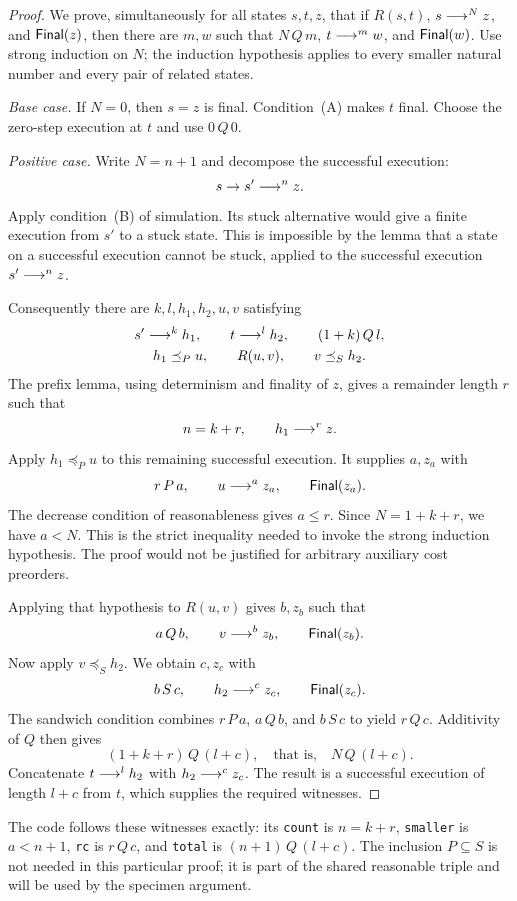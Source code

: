 \begin{proof}
We prove, simultaneously for all states $s,t,z$, that if $R(s,t)$,
$s\mathrel{\longrightarrow^{N}}z$, and $\mathsf{Final}(z)$, then there are $m,w$ such that
$N\,Q\,m$, $t\mathrel{\longrightarrow^{m}}w$, and $\mathsf{Final}(w)$. Use strong induction on $N$;
the induction hypothesis applies to every smaller natural number and every
pair of related states.

\emph{Base case.} If $N=0$, then $s=z$ is final. Condition~(A) makes
$t$ final. Choose the zero-step execution at $t$ and use $0\,Q\,0$.

\emph{Positive case.} Write $N=n+1$ and decompose the successful execution:
\[
 s\to s'\mathrel{\longrightarrow^{n}}z.
\]
Apply condition~(B) of simulation. Its stuck alternative would give a
finite execution from $s'$ to a stuck state. This is impossible by the
lemma that a state on a successful execution cannot be stuck, applied to
the successful execution $s'\mathrel{\longrightarrow^{n}}z$.

Consequently there are $k,l,h_1,h_2,u,v$ satisfying
\begin{gather*}
 s'\mathrel{\longrightarrow^{k}}h_1,\qquad t\mathrel{\longrightarrow^{l}}h_2,\qquad (1+k)\,Q\,l,\\
 h_1\preceq_P u,\qquad R(u,v),\qquad v\preceq_S h_2.
\end{gather*}
The prefix lemma, using determinism and finality of $z$, gives a remainder
length $r$ such that
\[
 n=k+r,\qquad h_1\mathrel{\longrightarrow^{r}}z.
\]
Apply $h_1\preceq_P u$ to this remaining successful execution. It supplies
$a,z_a$ with
\[
 r\,P\,a,\qquad u\mathrel{\longrightarrow^{a}}z_a,\qquad \mathsf{Final}(z_a).
\]
The decrease condition of reasonableness gives $a\leq r$. Since
$N=1+k+r$, we have $a<N$. This is the strict inequality needed to invoke
the strong induction hypothesis. The proof would not be justified for
arbitrary auxiliary cost preorders.

Applying that hypothesis to $R(u,v)$ gives $b,z_b$ such that
\[
 a\,Q\,b,\qquad v\mathrel{\longrightarrow^{b}}z_b,\qquad \mathsf{Final}(z_b).
\]
Now apply $v\preceq_S h_2$. We obtain $c,z_c$ with
\[
 b\,S\,c,\qquad h_2\mathrel{\longrightarrow^{c}}z_c,\qquad \mathsf{Final}(z_c).
\]
The sandwich condition combines $r\,P\,a$, $a\,Q\,b$, and $b\,S\,c$
to yield $r\,Q\,c$. Additivity of $Q$ then gives
\[
 (1+k+r)\,Q\,(l+c),\quad\text{that is,}\quad N\,Q\,(l+c).
\]
Concatenate $t\mathrel{\longrightarrow^{l}}h_2$ with $h_2\mathrel{\longrightarrow^{c}}z_c$. The result is a
successful execution of length $l+c$ from $t$, which supplies the required
witnesses.
\end{proof}

The code follows these witnesses exactly: its \texttt{count} is $n=k+r$,
\texttt{smaller} is $a<n+1$, \texttt{rc} is $r\,Q\,c$, and
\texttt{total} is $(n+1)\,Q\,(l+c)$. The inclusion $P\subseteq S$ is
not needed in this particular proof; it is part of the shared reasonable
triple and will be used by the specimen argument.
